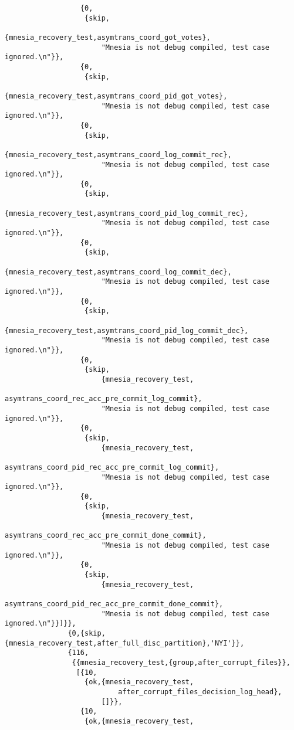 \begin{verbatim}
                  {0,
                   {skip,
                       {mnesia_recovery_test,asymtrans_coord_got_votes},
                       "Mnesia is not debug compiled, test case ignored.\n"}},
                  {0,
                   {skip,
                       {mnesia_recovery_test,asymtrans_coord_pid_got_votes},
                       "Mnesia is not debug compiled, test case ignored.\n"}},
                  {0,
                   {skip,
                       {mnesia_recovery_test,asymtrans_coord_log_commit_rec},
                       "Mnesia is not debug compiled, test case ignored.\n"}},
                  {0,
                   {skip,
                       {mnesia_recovery_test,asymtrans_coord_pid_log_commit_rec},
                       "Mnesia is not debug compiled, test case ignored.\n"}},
                  {0,
                   {skip,
                       {mnesia_recovery_test,asymtrans_coord_log_commit_dec},
                       "Mnesia is not debug compiled, test case ignored.\n"}},
                  {0,
                   {skip,
                       {mnesia_recovery_test,asymtrans_coord_pid_log_commit_dec},
                       "Mnesia is not debug compiled, test case ignored.\n"}},
                  {0,
                   {skip,
                       {mnesia_recovery_test,
                           asymtrans_coord_rec_acc_pre_commit_log_commit},
                       "Mnesia is not debug compiled, test case ignored.\n"}},
                  {0,
                   {skip,
                       {mnesia_recovery_test,
                           asymtrans_coord_pid_rec_acc_pre_commit_log_commit},
                       "Mnesia is not debug compiled, test case ignored.\n"}},
                  {0,
                   {skip,
                       {mnesia_recovery_test,
                           asymtrans_coord_rec_acc_pre_commit_done_commit},
                       "Mnesia is not debug compiled, test case ignored.\n"}},
                  {0,
                   {skip,
                       {mnesia_recovery_test,
                           asymtrans_coord_pid_rec_acc_pre_commit_done_commit},
                       "Mnesia is not debug compiled, test case ignored.\n"}}]}},
               {0,{skip,{mnesia_recovery_test,after_full_disc_partition},'NYI'}},
               {116,
                {{mnesia_recovery_test,{group,after_corrupt_files}},
                 [{10,
                   {ok,{mnesia_recovery_test,
                           after_corrupt_files_decision_log_head},
                       []}},
                  {10,
                   {ok,{mnesia_recovery_test,

\end{verbatim}

